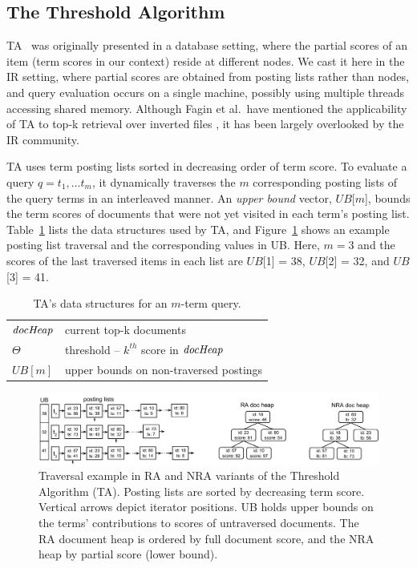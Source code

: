 \subsection{The Threshold Algorithm}

TA~\cite{Fagin:2003} was originally presented in a database setting, where the partial scores of an item (term scores  in our context)  reside at different nodes. We cast it here in the IR setting, where partial scores are obtained from posting lists rather than nodes, and query evaluation occurs on a single machine, possibly using multiple threads accessing shared memory. Although Fagin et al.\ have mentioned the applicability of TA to top-k retrieval over inverted files \cite{Fagin:2001}, it has been largely overlooked by the IR community.

TA uses  term posting lists sorted in decreasing order of term score. 
To evaluate a query $q = t_1, \dots t_m$, it dynamically traverses the $m$ corresponding posting lists of the query terms in an interleaved manner. 
An \emph{upper bound} vector, $UB$[$m$], 
bounds the term scores of documents that were not yet visited in each term's posting list. 
Table~\ref{table:threshold-ds} lists the data structures used by TA, and 
%
Figure~\ref{fig:lists} shows
an example posting list traversal and the corresponding values in UB. Here, $m=3$ and the scores of the last traversed items in each list are $UB$[1] = 38, $UB$[2] = 32, and $UB$[3] = 41. 
\begin{table}[t]
\begin{tabular}{ l l }
\hline
$\textit{docHeap}$   	& current top-k documents \\
$\Theta$  & threshold -- $k^{th}$ score in $\textit{docHeap}$ \\
$UB[m]$  & upper bounds on non-traversed postings\\ 
\hline
\end{tabular}
\caption{TA's data structures for an $m$-term query.\vspace{-5mm}}
\label{table:threshold-ds}
\end{table}



\begin{figure}[tbh]
\centering
\includegraphics[width=\linewidth]{figures/postingsLists}
\caption{Traversal example in  RA and NRA variants of the Threshold Algorithm (TA). Posting lists are sorted by decreasing term score. Vertical arrows depict  iterator positions.  UB  holds upper bounds on the terms' contributions to scores of untraversed documents. The RA document heap is ordered by full document score, and the NRA heap  by partial score (lower bound).}
\label{fig:lists}
\end{figure}

